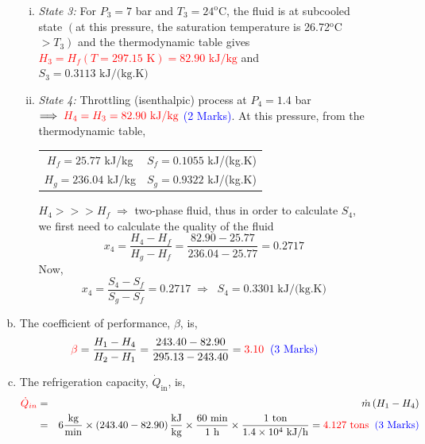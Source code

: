\documentclass[12pt,twoside]{report}
\newcommand{\frc}{\displaystyle\frac}
\begin{document}
\begin{description}
\begin{enumerate}[(a)]
\begin{enumerate}[(i)]
\item {\it State 3:} For $P_{3}=7$ bar and $T_{3}=24^{\text{o}}$C, the fluid is at subcooled state $\left(\right.$at this pressure, the saturation temperature is 26.72$^{\text{o}}$C $\left.>T_{3}\right)$ and the thermodynamic table gives \textcolor{red}{$H_{3}=H_{f}\left(T=297.15\text{ K}\right)=82.90\text{ kJ/kg}$} \textcolor{blue}{} and $S_{3}=0.3113\text{ kJ/(kg.K)}$
\item {\it State 4:} Throttling (isenthalpic) process at $P_{4}=1.4$ bar $\Longrightarrow\;\textcolor{red}{H_{4}=H_{3}=82.90\text{ kJ/kg}}$ \textcolor{blue}{(2 Marks)}. At this pressure, from the thermodynamic table,
\begin{center}
\begin{tabular}{c c}
$H_{f}=25.77$ kJ/kg & $S_{f}=0.1055$ kJ/(kg.K) \\
$H_{g}=236.04$ kJ/kg & $S_{g}=0.9322$ kJ/(kg.K) \\
\end{tabular}
\end{center} 
$H_{4}>>>H_{f} \;\Longrightarrow$ two-phase fluid, thus in order to calculate $S_{4}$, we first need to calculate the quality of the fluid
\begin{displaymath}
x_{4}=\frc{H_{4}-H_{f}}{H_{g}-H_{f}}=\frc{82.90-25.77}{236.04-25.77}=0.2717
\end{displaymath}
Now,
\begin{displaymath}
x_{4}=\frc{S_{4}-S_{f}}{S_{g}-S_{f}}=0.2717\;\Longrightarrow\;\;S_{4}=0.3301\;\text{kJ/(kg.K)}
\end{displaymath}
\end{enumerate}

\item The coefficient of performance, $\beta$, is,
\begin{displaymath}
\textcolor{red}{\beta}=\frc{H_{1}-H_{4}}{H_{2}-H_{1}}=\frc{243.40-82.90}{295.13-243.40}=\textcolor{red}{3.10}\;\;\textcolor{blue}{\text{(3 Marks)}}
\end{displaymath}

\item The refrigeration capacity, $\dot{Q}_{\text{in}}$, is,
\begin{eqnarray}
\textcolor{red}{\dot{Q}_{in}}&=& \dot{m}\left(H_{1}-H_{4}\right) \nonumber \\
         &=& 6\frc{\text{kg}}{\text{min}} \times \left(243.40-82.90\right) \frc{\text{kJ}}{\text{kg}} \times \frc{60\text{ min}}{1\text{ h}} \times \frc{1\text{ ton}}{1.4\times10^{4}\text{ kJ/h}} = \textcolor{red}{4.127\text{ tons}}\;\;\textcolor{blue}{\text{(3 Marks)}}\nonumber
\end{eqnarray}


\end{enumerate}
\end{description}
\end{document}
